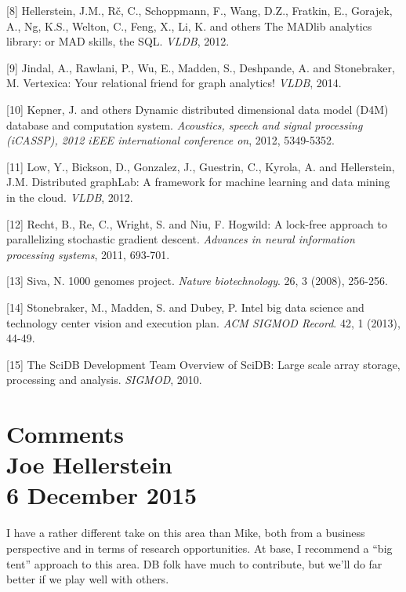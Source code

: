 \documentclass[b5paper,11pt,twoside,openright]{book}
\begin{document}
\leavevmode\hypertarget{ref-madlib}{}%
{[}8{]} Hellerstein, J.M., Rč, C., Schoppmann, F., Wang, D.Z., Fratkin,
E., Gorajek, A., Ng, K.S., Welton, C., Feng, X., Li, K. and others The
MADlib analytics library: or MAD skills, the SQL. \emph{VLDB}, 2012.

\leavevmode\hypertarget{ref-vertexica}{}%
{[}9{]} Jindal, A., Rawlani, P., Wu, E., Madden, S., Deshpande, A. and
Stonebraker, M. Vertexica: Your relational friend for graph analytics!
\emph{VLDB}, 2014.

\leavevmode\hypertarget{ref-d4m}{}%
{[}10{]} Kepner, J. and others Dynamic distributed dimensional data
model (D4M) database and computation system. \emph{Acoustics, speech and
  signal processing (iCASSP), 2012 iEEE international conference on},
2012, 5349-5352.

\leavevmode\hypertarget{ref-graphlab}{}%
{[}11{]} Low, Y., Bickson, D., Gonzalez, J., Guestrin, C., Kyrola, A.
and Hellerstein, J.M. Distributed graphLab: A framework for machine
learning and data mining in the cloud. \emph{VLDB}, 2012.

\leavevmode\hypertarget{ref-hogwild}{}%
{[}12{]} Recht, B., Re, C., Wright, S. and Niu, F. Hogwild: A lock-free
approach to parallelizing stochastic gradient descent. \emph{Advances in
  neural information processing systems}, 2011, 693-701.

\leavevmode\hypertarget{ref-1000-genomes}{}%
{[}13{]} Siva, N. 1000 genomes project. \emph{Nature biotechnology}. 26,
3 (2008), 256-256.

\leavevmode\hypertarget{ref-istc-bigdata}{}%
{[}14{]} Stonebraker, M., Madden, S. and Dubey, P. Intel big data
science and technology center vision and execution plan. \emph{ACM
  SIGMOD Record}. 42, 1 (2013), 44-49.

\leavevmode\hypertarget{ref-scidb}{}%
{[}15{]} The SciDB Development Team Overview of SciDB: Large scale array
storage, processing and analysis. \emph{SIGMOD}, 2010.

\section*[Comments]{Comments\\%
{\normalsize Joe Hellerstein}\\%
{\normalsize 6 December 2015}%
}

I have a rather different take on this area than Mike, both from a
business perspective and in terms of research opportunities. At base, I
recommend a ``big tent'' approach to this area. DB folk have much to
contribute, but we'll do far better if we play well with others.
\end{document}
